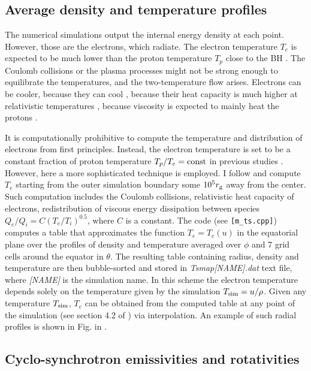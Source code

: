 \documentclass{emulateapj}
\begin{document}
\subsection{Average density and temperature profiles}
The numerical simulations output the internal energy density at each
point. However, those are the electrons, which radiate.  The electron
temperature $T_e$ is expected to be much lower than the proton
temperature $T_p$ close to the BH \citep{Narayan:1995kj}.  The Coulomb
collisions or the plasma processes might not be strong enough to
equilibrate the temperatures, and the two-temperature flow arises.
Electrons can be cooler, because they can cool
\citep{Drappeau:2012dq}, because their heat capacity is much higher at
relativistic temperatures \citep{Shcherbakov:2010cond}, because
viscosity is expected to mainly heat the protons
\citep{Narayan:1995kj,Sharma_heating:2007}.

It is computationally prohibitive to compute the temperature and
distribution of electrons from first principles. Instead, the electron
temperature is set to be a constant fraction of proton temperature
$T_p/T_e=\rm const$ in previous studies
\citep{Moscibrodzka:2009,Dexter:2010lk}.  However, here a more
sophisticated technique is employed. I follow
\citet{Sharma_heating:2007} and compute $T_e$ starting from the outer
simulation boundary some $10^5r_{\rm g}$ away from the center. Such
computation includes the Coulomb collisions, relativistic heat
capacity of electrons, redistribution of viscous energy dissipation
between species $Q_e/Q_i=C(T_e/T_i)^{0.5}$, where $C$ is a constant.
The code (see {\tt [m\_ts.cpp]}) computes a table that approximates
the function $T_e=T_e(u)$ in the equatorial plane over the profiles of
density and temperature averaged over $\phi$ and 7 grid cells around
the equator in $\theta$.  The resulting table containing radius,
density and temperature are then bubble-sorted and stored in
\textit{Tsmap[NAME].dat} text file, where \textit{[NAME]} is the
simulation name.  In this scheme the electron temperature depends
solely on the temperature given by the simulation $T_{\rm
  sim}=u/\rho$. Given any temperature $T_{\rm sim}$, $T_e$ can be
obtained from the computed table at any point of the simulation (see
section 4.2 of \cite{Shcherbakov:2012appl}) via interpolation. An
example of such radial profiles is shown in Fig. in
\cite{Shcherbakov:2012appl}.



\subsection{Cyclo-synchrotron emissivities and rotativities}
\end{document}
